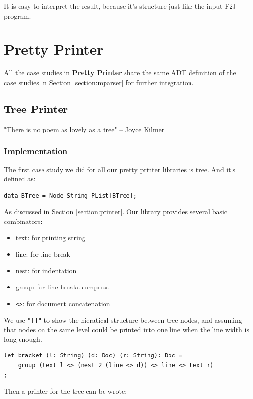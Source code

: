 It is easy to interpret the result, because it's structure just like the input F2J program.

\section{Pretty Printer}

All the case studies in \textbf{Pretty Printer} share the same ADT definition of the case studies in Section \ref{section:mparser} for further integration.

\subsection{Tree Printer}

"There is no poem as lovely as a tree" -- Joyce Kilmer

\subsubsection{Implementation}

The first case study we did for all our pretty printer libraries is tree. And it's defined as:

\begin{lstlisting}
data BTree = Node String PList[BTree];
\end{lstlisting}

As discussed in Section \ref{section:printer}. Our library provides several basic combinators:

\begin{itemize}
\item text:    for printing string
\item line:    for line break
\item nest:    for indentation
\item group:   for line breaks compress
\item \texttt{<>}:      for document concatenation
\end{itemize}

We use \texttt{"[]"} to show the hieratical structure between tree nodes, and assuming that nodes on the same level could be printed into one line when the line width is long enough.
\begin{lstlisting}
let bracket (l: String) (d: Doc) (r: String): Doc =
    group (text l <> (nest 2 (line <> d)) <> line <> text r)
;
\end{lstlisting}

Then a printer for the tree can be wrote:

